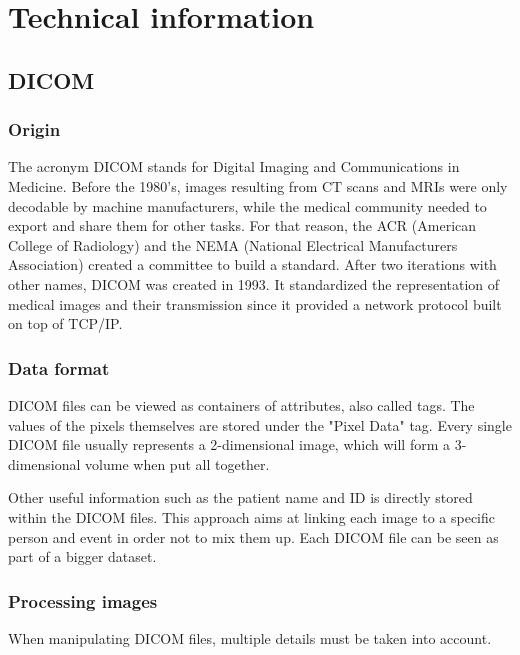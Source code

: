 
\chapter{Technical information}
\label{ch:technical_info}

\section{DICOM}

\subsection{Origin}

The acronym DICOM stands for Digital Imaging and Communications in Medicine. Before the 1980’s, images resulting from CT scans and MRIs were only decodable by machine manufacturers, while the medical community needed to export and share them for other tasks. For that reason, the ACR (American College of Radiology) and the NEMA (National Electrical Manufacturers Association) created a committee to build a standard. After two iterations with other names, DICOM was created in 1993. It standardized the representation of medical images and their transmission since it provided a network protocol built on top of TCP/IP.


\subsection{Data format}

DICOM files can be viewed as containers of attributes, also called tags. The values of the pixels themselves are stored under the "Pixel Data" tag. Every single DICOM file usually represents a 2-dimensional image, which will form a 3-dimensional volume when put all together. 

Other useful information such as the patient name and ID is directly stored within the DICOM files. This approach aims at linking each image to a specific person and event in order not to mix them up. Each DICOM file can be seen as part of a bigger dataset. 


\subsection{Processing images}

When manipulating DICOM files, multiple details must be taken into account. 

